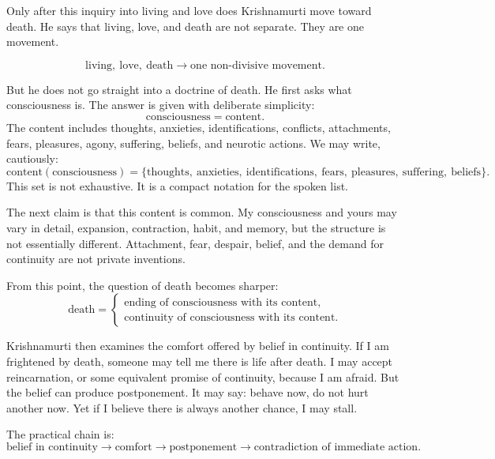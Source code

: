 Only after this inquiry into living and love does Krishnamurti move toward death. He says that living, love, and death are not separate. They are one movement.

\begin{equation}
\text{living},\ \text{love},\ \text{death}
   \longrightarrow
\text{one non-divisive movement}.
\end{equation}

But he does not go straight into a doctrine of death. He first asks what consciousness is. The answer is given with deliberate simplicity:
\begin{equation}
\text{consciousness} = \text{content}.
\end{equation}
The content includes thoughts, anxieties, identifications, conflicts, attachments, fears, pleasures, agony, suffering, beliefs, and neurotic actions. We may write, cautiously:
\begin{equation}
\text{content}(\text{consciousness})
=
\{\text{thoughts},\ \text{anxieties},\ \text{identifications},\ \text{fears},\ \text{pleasures},\ \text{suffering},\ \text{beliefs}\}.
\end{equation}
This set is not exhaustive. It is a compact notation for the spoken list.

The next claim is that this content is common. My consciousness and yours may vary in detail, expansion, contraction, habit, and memory, but the structure is not essentially different. Attachment, fear, despair, belief, and the demand for continuity are not private inventions.

From this point, the question of death becomes sharper:
\begin{equation}
\text{death}
=
\begin{cases}
\text{ending of consciousness with its content},\\
\text{continuity of consciousness with its content}.
\end{cases}
\end{equation}

Krishnamurti then examines the comfort offered by belief in continuity. If I am frightened by death, someone may tell me there is life after death. I may accept reincarnation, or some equivalent promise of continuity, because I am afraid. But the belief can produce postponement. It may say: behave now, do not hurt another now. Yet if I believe there is always another chance, I may stall.

The practical chain is:
\begin{equation}
\text{belief in continuity}
   \longrightarrow
\text{comfort}
   \longrightarrow
\text{postponement}
   \longrightarrow
\text{contradiction of immediate action}.
\end{equation}

